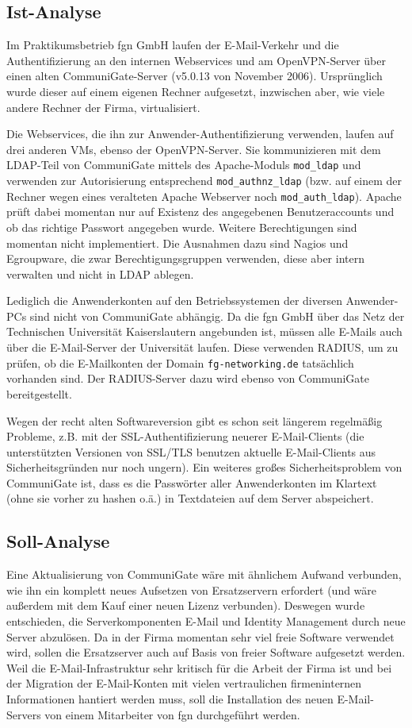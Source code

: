 \documentclass[11pt,a4paper,titlepage=firstiscover,headsepline,bibtotoc]{scrartcl} %
\begin{document}
\subsection{Ist-Analyse}\label{sec:Ist-Analyse}
Im Praktikumsbetrieb fgn GmbH laufen der E-Mail-Verkehr und die Authentifizierung an den internen Webservices und am OpenVPN-Server über einen alten CommuniGate-Server (v5.0.13 von November 2006). Ursprünglich wurde dieser auf einem eigenen Rechner aufgesetzt, inzwischen aber, wie viele andere Rechner der Firma, virtualisiert. 

Die Webservices, die ihn zur Anwender-Authentifizierung verwenden, laufen auf drei anderen VMs, ebenso der OpenVPN-Server. Sie kommunizieren mit dem LDAP-Teil von CommuniGate mittels des Apache-Moduls \texttt{mod\_ldap} und verwenden zur Autorisierung entsprechend \texttt{mod\_authnz\_ldap} (bzw. auf einem der Rechner wegen eines veralteten Apache Webserver noch \texttt{mod\_auth\_ldap}). Apache prüft dabei momentan nur auf Existenz des angegebenen Benutzeraccounts und ob das richtige Passwort angegeben wurde. Weitere Berechtigungen sind momentan nicht implementiert. Die Ausnahmen dazu sind Nagios und Egroupware, die zwar Berechtigungsgruppen verwenden, diese aber intern verwalten und nicht in LDAP ablegen.

Lediglich die Anwenderkonten auf den Betriebssystemen der diversen Anwender-PCs sind nicht von CommuniGate abhängig. Da die fgn GmbH über das Netz der Technischen Universität Kaiserslautern angebunden ist, müssen alle E-Mails auch über die E-Mail-Server der Universität laufen. Diese verwenden RADIUS, um zu prüfen, ob die E-Mailkonten der Domain \texttt{fg-networking.de} tatsächlich vorhanden sind. Der RADIUS-Server dazu wird ebenso von CommuniGate bereitgestellt. 

Wegen der recht alten Softwareversion gibt es schon seit längerem regelmäßig Probleme, z.B. mit der SSL-Authentifizierung neuerer E-Mail-Clients (die unterstützten Versionen von SSL/TLS benutzen aktuelle E-Mail-Clients aus Sicherheitsgründen nur noch ungern). Ein weiteres großes Sicherheitsproblem von CommuniGate ist, dass es die Passwörter aller Anwenderkonten im Klartext (ohne sie vorher zu hashen o.ä.) in Textdateien auf dem Server abspeichert.

\subsection{Soll-Analyse}
Eine Aktualisierung von CommuniGate wäre mit ähnlichem Aufwand verbunden, wie ihn ein komplett neues Aufsetzen von Ersatzservern erfordert (und wäre außerdem mit dem Kauf einer neuen Lizenz verbunden). Deswegen wurde entschieden, die Serverkomponenten E-Mail und Identity Management durch neue Server abzulösen. Da in der Firma momentan sehr viel freie Software verwendet wird, sollen die Ersatzserver auch auf Basis von freier Software aufgesetzt werden. Weil die E-Mail-Infrastruktur sehr kritisch für die Arbeit der Firma ist und bei der Migration der E-Mail-Konten mit vielen vertraulichen firmeninternen Informationen hantiert werden muss, soll die Installation des neuen E-Mail-Servers von einem Mitarbeiter von fgn durchgeführt werden.
\end{document}
